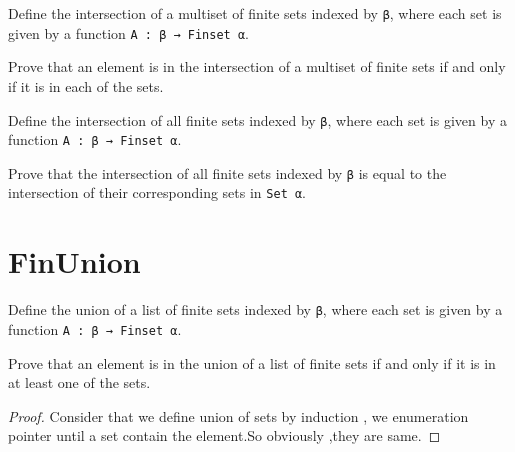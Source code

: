 \begin{definition}\label{Multiset.FinInter}
  Define the intersection of a multiset of finite sets indexed by \verb|β|, where each set is given by a function \verb|A : β → Finset α|.
\end{definition}

\begin{lemma}\label{Multiset.eq_FinInter}
  Prove that an element is in the intersection of a multiset of finite sets if and only if it is in each of the sets.
\end{lemma}

\begin{definition}\label{FinInter₀}
  Define the intersection of all finite sets indexed by \verb|β|, where each set is given by a function \verb|A : β → Finset α|.
\end{definition}

\begin{lemma}\label{eq_FinInter₀}
  Prove that the intersection of all finite sets indexed by \verb|β| is equal to the intersection of their corresponding sets in \verb|Set α|.
\end{lemma}

\section{FinUnion}

\begin{definition}\label{List.FinUnion}
  \leanok
  Define the union of a list of finite sets indexed by \verb|β|, where each set is given by a function \verb|A : β → Finset α|.
\end{definition}

\begin{lemma}\label{List.eq_FinUnion}
  Prove that an element is in the union of a list of finite sets if and only if it is in at least one of the sets.
\end{lemma}

\begin{proof} 
  \leanok
  Consider that we define union of sets by induction , we enumeration pointer until a set contain the element.So obviously ,they are same.
\end{proof}

